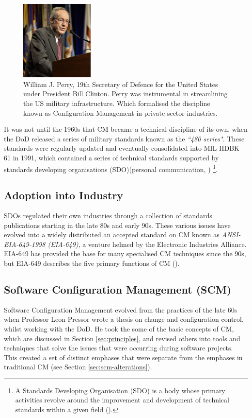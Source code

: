 \documentclass[cmpstyle]{ueacmpstyle}
\begin{document}
		\begin{figure}
			\centering
			\includegraphics[height=4cm]{images/william-perry.jpg}
			\caption{William J. Perry, 19th Secretary of Defence for the United States under President Bill Clinton. Perry was instrumental in streamlining the US military infrastructure. Which formalised the discipline known as Configuration Management in private sector industries.} \label{fig:william}
		\end{figure}
	
		It was not until the 1960s that CM became a technical discipline of its own, when the DoD released a series of military standards known as the \emph{``480 series"}. These standards were regularly updated and eventually consolidated into MIL-HDBK-61 in 1991, which contained a series of technical standards supported by standards developing organisations (SDO)(personal communication, \cite{dod-history}) \footnote{A Standards Developing Organisation (SDO) is a body whose primary activities revolve around the improvement and development of technical standards within a given field (\cite{history-standards}).}.
		
		\subsection{Adoption into Industry} \label{sec:adoption}
		SDOs regulated their own industries through a collection of standards publications starting in the late 80s and early 90s. These various issues have evolved into a widely distributed an accepted standard on CM known as \emph{ANSI-EIA-649-1998 (EIA-649)}, a venture helmed by the Electronic Industries Alliance. EIA-649 has provided the base for many specialised CM techniques since the 90s, but EIA-649 describes the five primary functions of CM (\cite{EIA-649}). 
		
		\subsection{Software Configuration Management (SCM)} \label{sec:scm}
		Software Configuration Management evolved from the practices of the late 60s when Professor Leon Pressor wrote a thesis on change and configuration control, whilst working with the DoD. He took the some of the basic concepts of CM, which are discussed in Section \ref{sec:principles}, and revised others into tools and techniques that solve the issues that were occurring during software projects. This created a set of distinct emphases that were separate from the emphases in traditional CM (see Section \ref{sec:scm-alterations}).
		
\end{document}
